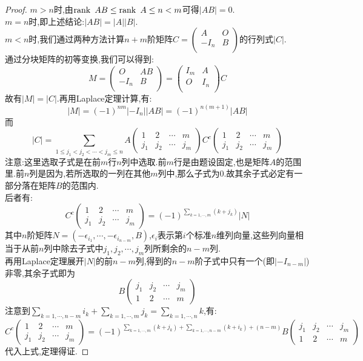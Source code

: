 \documentclass[UTF8,a4paper,notitlepage]{book}
\begin{document}
        \begin{proof}\mbox{}
            $m>n$时,由$\operatorname{rank}~AB\leq \operatorname{rank}~A\leq n<m$可得$|AB|=0$.\\ 
            $m=n$时,即上述结论:$|AB|=|A||B|$.\\ 
            $m<n$时,我们通过两种方法计算$n+m$阶矩阵$C=\begin{pmatrix}A&O\\ -I_n&B\\ \end{pmatrix}$的行列式$|C|$.\\ 
            通过分块矩阵的初等变换,我们可以得到:$$M=\begin{pmatrix}O&AB\\ -I_n&B\\ \end{pmatrix}=\begin{pmatrix}I_m&A\\ O&I_n\\ \end{pmatrix}C$$
            故有$|M|=|C|$.再用Laplace定理计算,有:$$|M|=(-1)^{nm}|-I_n||AB|=(-1)^{n(m+1)}|AB|$$
            而$$|C|=\sum_{1\leq j_1<j_2<\cdots <j_m\leq n}A\begin{pmatrix}1 & 2 & \cdots & m \\ j_1 & j_2 & \cdots & j_m\end{pmatrix}C^c\begin{pmatrix}1 & 2 & \cdots & m \\ j_1 & j_2 & \cdots & j_m\end{pmatrix}$$
            注意:这里选取子式是在前$m$行$n$列中选取.前$m$行是由题设固定,也是矩阵$A$的范围里.前$n$列是因为,若所选取的一列在其他$m$列中,那么子式为0.故其余子式必定有一部分落在矩阵$B$的范围内.\\ 
            后者有:$$C^c\begin{pmatrix}1 & 2 & \cdots & m \\ j_1 & j_2 & \cdots & j_m\end{pmatrix}=(-1)^{\sum\limits_{k=1,\cdots,m}(k+j_k)}|N|$$
            其中$n$阶矩阵$N=(-\epsilon_{i_1},\cdots,-\epsilon_{i_{n-m}},B)$,$\epsilon_i$表示第$i$个标准$n$维列向量,这些列向量相当于从前$n$列中除去子式中$j_1,j_2,\cdots,j_m$列所剩余的$n-m$列.\\ 
            再用Laplace定理展开$|N|$的前$n-m$列,得到的$n-m$阶子式中只有一个(即$|-I_{n-m}|$)非零,其余子式即为$$B\begin{pmatrix}j_1 & j_2 & \cdots & j_m \\ 1 & 2 & \cdots & m\end{pmatrix}$$
            注意到$\sum\limits_{k=1,\cdots,n-m}i_k+\sum\limits_{k=1,\cdots,m}j_k=\sum\limits_{k=1,\cdots,n}k$,有:
            $$C^c\begin{pmatrix}1 & 2 & \cdots & m \\ j_1 & j_2 & \cdots & j_m\end{pmatrix}=(-1)^{\sum\limits_{k=1,\cdots,m}(k+j_k)+\sum\limits_{k=1,\cdots,n-m}(k+i_k)+(n-m)}B\begin{pmatrix}j_1 & j_2 & \cdots & j_m \\ 1 & 2 & \cdots & m\end{pmatrix}$$
            代入上式,定理得证.

\end{proof}
\end{document}
